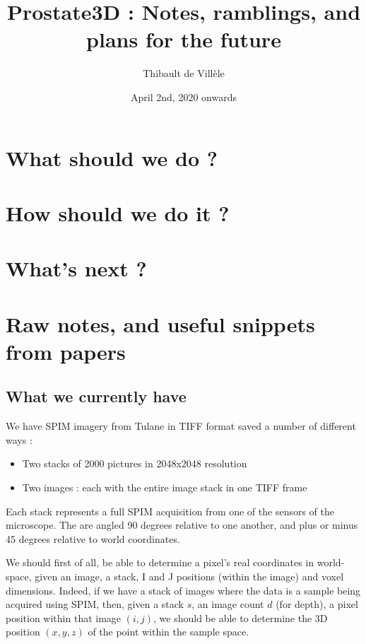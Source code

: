 \documentclass[a4paper]{article}
\title{Prostate3D : Notes, ramblings, and plans for the future}
\author{Thibault de Villèle}
\date{April 2nd, 2020 onwards}
\begin{document}
{
	\maketitle
	\clearpage

	\section{What should we do ?}
	{
	}
	\section{How should we do it ?}
	{
	}
	\section{What's next ?}
	{
	}
	\section{Raw notes, and useful snippets from papers}
	{
		\subsection{What we currently have}
		{
			We have SPIM imagery from Tulane in TIFF format saved a number of different ways :

			\begin{itemize} \label{list:different_image_types}
				\item Two stacks of 2000 pictures in 2048x2048 resolution \label{item:different_image_types:stacks}
				\item Two images : each with the entire image stack in one TIFF frame \label{item:different_image_types:single_image}
			\end{itemize}

			Each stack represents a full SPIM acquisition from one of the sensors of the microscope. The are angled 90 degrees relative to one another, and plus or minus 45 degrees relative to world coordinates.

			We should first of all, be able to determine a pixel's real coordinates in world-space, given an image, a stack, I and J positions (within the image) and voxel dimensions. Indeed, if we have a stack of images where the data is a sample being acquired using SPIM, then, given a stack $s$, an image count $d$ (for depth), a pixel position within that image $(i,j)$, we should be able to determine the 3D position $(x,y,z)$ of the point within the sample space.

}}}
\end{document}
